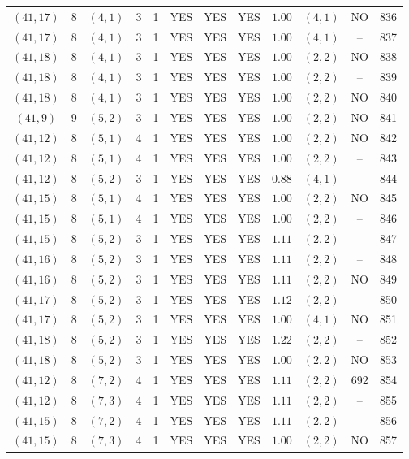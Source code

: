 \begin{longtable}{|c|c|c|c|c|c|c|c|c|c|c|c|}
$(41,17)$ & 8 & $(4,1)$ & 3 & 1 & YES & YES & YES & $1.00$ & $(4,1)$ & NO & 836\\
$(41,17)$ & 8 & $(4,1)$ & 3 & 1 & YES & YES & YES & $1.00$ & $(4,1)$ & -- & 837\\
$(41,18)$ & 8 & $(4,1)$ & 3 & 1 & YES & YES & YES & $1.00$ & $(2,2)$ & NO & 838\\
$(41,18)$ & 8 & $(4,1)$ & 3 & 1 & YES & YES & YES & $1.00$ & $(2,2)$ & -- & 839\\
$(41,18)$ & 8 & $(4,1)$ & 3 & 1 & YES & YES & YES & $1.00$ & $(2,2)$ & NO & 840\\
$(41,9)$ & 9 & $(5,2)$ & 3 & 1 & YES & YES & YES & $1.00$ & $(2,2)$ & NO & 841\\
$(41,12)$ & 8 & $(5,1)$ & 4 & 1 & YES & YES & YES & $1.00$ & $(2,2)$ & NO & 842\\
$(41,12)$ & 8 & $(5,1)$ & 4 & 1 & YES & YES & YES & $1.00$ & $(2,2)$ & -- & 843\\
$(41,12)$ & 8 & $(5,2)$ & 3 & 1 & YES & YES & YES & $0.88$ & $(4,1)$ & -- & 844\\
$(41,15)$ & 8 & $(5,1)$ & 4 & 1 & YES & YES & YES & $1.00$ & $(2,2)$ & NO & 845\\
$(41,15)$ & 8 & $(5,1)$ & 4 & 1 & YES & YES & YES & $1.00$ & $(2,2)$ & -- & 846\\
$(41,15)$ & 8 & $(5,2)$ & 3 & 1 & YES & YES & YES & $1.11$ & $(2,2)$ & -- & 847\\
$(41,16)$ & 8 & $(5,2)$ & 3 & 1 & YES & YES & YES & $1.11$ & $(2,2)$ & -- & 848\\
$(41,16)$ & 8 & $(5,2)$ & 3 & 1 & YES & YES & YES & $1.11$ & $(2,2)$ & NO & 849\\
$(41,17)$ & 8 & $(5,2)$ & 3 & 1 & YES & YES & YES & $1.12$ & $(2,2)$ & -- & 850\\
$(41,17)$ & 8 & $(5,2)$ & 3 & 1 & YES & YES & YES & $1.00$ & $(4,1)$ & NO & 851\\
$(41,18)$ & 8 & $(5,2)$ & 3 & 1 & YES & YES & YES & $1.22$ & $(2,2)$ & -- & 852\\
$(41,18)$ & 8 & $(5,2)$ & 3 & 1 & YES & YES & YES & $1.00$ & $(2,2)$ & NO & 853\\
$(41,12)$ & 8 & $(7,2)$ & 4 & 1 & YES & YES & YES & $1.11$ & $(2,2)$ & 692 & 854\\
$(41,12)$ & 8 & $(7,3)$ & 4 & 1 & YES & YES & YES & $1.11$ & $(2,2)$ & -- & 855\\
$(41,15)$ & 8 & $(7,2)$ & 4 & 1 & YES & YES & YES & $1.11$ & $(2,2)$ & -- & 856\\
$(41,15)$ & 8 & $(7,3)$ & 4 & 1 & YES & YES & YES & $1.00$ & $(2,2)$ & NO & 857\\

\end{longtable}
